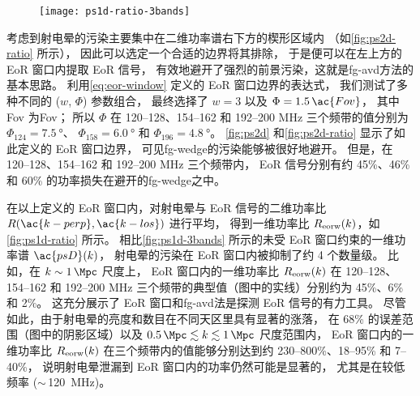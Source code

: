 \begin{figure}[htp]
  \centering
  \texttt{[image: ps1d-ratio-3bands]}
  \label{fig:ps1d-ratio}
\end{figure}

考虑到射电晕的污染主要集中在二维功率谱右下方的楔形区域内
（如\autoref{fig:ps2d-ratio} 所示），
因此可以选定一个合适的边界将其排除，
于是便可以在左上方的 EoR 窗口内提取 EoR 信号，
有效地避开了强烈的前景污染，这就是\ac{fg-avd}方法的基本思路。
利用\autoref{eq:eor-window} 定义的 EoR 窗口边界的表达式，
我们测试了多种不同的 ($w$, $\Phi$) 参数组合，
最终选择了 $w = 3$ 以及 $\Phi = 1.5\,\ac{Fov}$，
其中 \ac{Fov} 为\acl{Fov}；
所以 $\Phi$ 在 \numrange{120}{128}、\numrange{154}{162}
和 \numrange{192}{200} \si{\MHz} 三个频带的值分别为
$\Phi_{124} = \SI{7.5}{\degree}$、
$\Phi_{158} = \SI{6.0}{\degree}$ 和
$\Phi_{196} = \SI{4.8}{\degree}$。
\autoref{fig:ps2d} 和\autoref{fig:ps2d-ratio} 显示了如此定义的 EoR 窗口边界，
可见\ac{fg-wedge}的污染能够被很好地避开。
但是，在 \numrange{120}{128}、\numrange{154}{162}
和 \numrange{192}{200} \si{\MHz} 三个频带内，
EoR 信号分别有约 45\%、46\% 和 60\% 的功率损失在避开的\ac{fg-wedge}之中。

在以上定义的 EoR 窗口内，对射电晕与 EoR 信号的二维功率比
$R(\ac{k-perp}, \ac{k-los})$ 进行平均，
得到一维功率比 $R_{\mathrm{eorw}}(k)$，如\autoref{fig:ps1d-ratio} 所示。
相比\autoref{fig:ps1d-3bands} 所示的未受 EoR 窗口约束的一维功率谱 $\ac{psD}(k)$，
射电晕的污染在 EoR 窗口内被抑制了约 4 个数量级。
比如，在 $k \sim \SI{1}{\per\Mpc}$ 尺度上，
EoR 窗口内的一维功率比 $R_{\mathrm{eorw}}(k)$ 在 \numrange{120}{128}、
\numrange{154}{162} 和 \numrange{192}{200} \si{\MHz}
三个频带的典型值（图中的实线）分别约为 45\%、6\% 和 2\%。
这充分展示了 EoR 窗口和\ac{fg-avd}法是探测 EoR 信号的有力工具。
尽管如此，由于射电晕的亮度和数目在不同天区里具有显著的涨落，
在 68\% 的误差范围（图中的阴影区域）以及
$\SI{0.5}{\per\Mpc} \lesssim k \lesssim \SI{1}{\per\Mpc}$ 尺度范围内，
EoR 窗口内的一维功率比 $R_{\mathrm{eorw}}(k)$ 在三个频带内的值能够分别达到约
\numrange{230}{800}\%、\numrange{18}{95}\% 和 \numrange{7}{40}\%，
说明射电晕泄漏到 EoR 窗口内的功率仍然可能是显著的，
尤其是在较低频率 ($\sim$\,\SI{120}{\MHz})。

